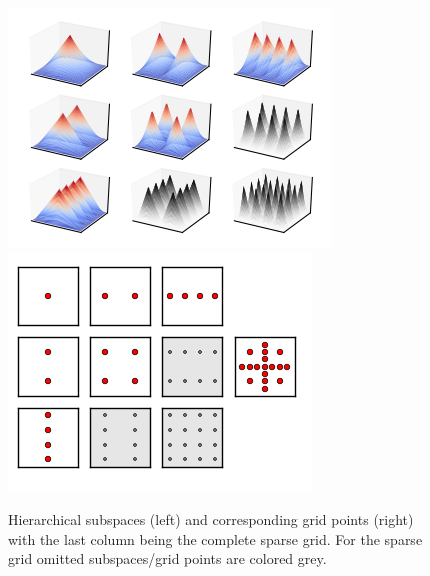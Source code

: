\begin{figure}[t!]
  \centering
  \includegraphics{images/figure_2.png}
  \includegraphics{images/figure_3.png}
  \caption{Hierarchical subspaces (left) and corresponding grid points
    (right) with the last column being the complete sparse grid.
    For the sparse grid omitted subspaces/grid points are colored grey.
    \label{fig:fig2}}
\end{figure}

